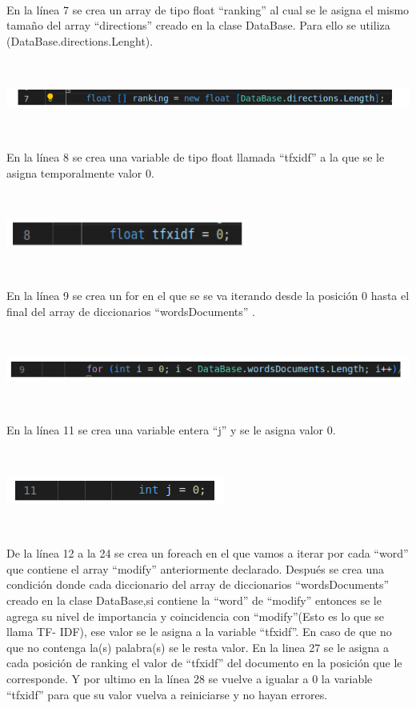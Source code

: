 \documentclass{article}
\begin{document}
{\

En la línea 7 se crea un array de tipo float “ranking” al cual se le asigna el mismo tamaño del array “directions” creado en la clase DataBase. Para ello se utiliza 
(DataBase.directions.Lenght).

\

\centering
\includegraphics[height = 0.6 cm ]{Captura desde 2023-07-18 22-49-05.png}

\

En la línea 8 se crea una variable de tipo float llamada “tfxidf” a la que se le asigna temporalmente valor 0. 

\

\centering
\includegraphics[height = 0.6 cm ]{Captura desde 2023-07-18 22-52-16.png}

\

En la línea 9 se crea un for en el que se se va iterando desde la posición 0 hasta el final del array de diccionarios  “wordsDocuments” . 

\

\centering
\includegraphics[height = 0.6 cm ]{Captura desde 2023-07-18 22-58-20.png}

\

En la línea 11 se crea una variable entera “j” y se le asigna valor 0.

\

\centering
\includegraphics[height = 0.8 cm ]{Captura desde 2023-07-18 23-01-19.png}

\

De la línea 12 a la 24 se crea un foreach en el que vamos a iterar por cada “word” que contiene el array “modify” anteriormente declarado. Después se crea una condición
donde cada diccionario del array  de diccionarios “wordsDocuments” creado en la clase DataBase,si contiene la “word” de “modify” entonces se le agrega su nivel de 
importancia y coincidencia con “modify”(Esto es lo que se llama TF- IDF), ese valor se le asigna a la variable “tfxidf”. En caso de que no que no contenga la(s) palabra(s) 
se le resta valor. En la linea 27 se le asigna a cada posición de ranking el valor de “tfxidf” del documento en la posición que le corresponde. Y por ultimo en la línea 28
se vuelve a igualar a 0 la variable “tfxidf” para que su valor vuelva a reiniciarse y no hayan errores. 

}
\end{document}
